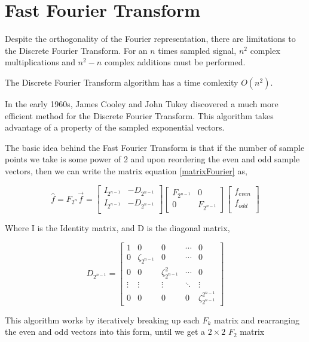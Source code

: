 \documentclass[11pt]{amsart}
\theoremstyle{definition}
\theoremstyle{remark}
\numberwithin{equation}{section}
\begin{document}
\section{Fast Fourier Transform}
Despite the orthogonality of the Fourier representation, there are limitations to the Discrete Fourier Transform. For an $n$ times sampled signal, $n^2$ complex multiplications and $n^2 - n$ complex additions must be performed.

The Discrete Fourier Transform algorithm has a time comlexity $O(n^2)$.

In the early 1960s, James Cooley and John Tukey discovered a much more efficient method for the Discrete Fourier Transform. This algorithm takes advantage of a property of the sampled exponential vectors.

The basic idea behind the Fast Fourier Transform is that if the number of sample points we take is some power of 2 and upon reordering the even and odd sample vectors, then we can write the matrix equation \ref{matrixFourier} as,

\[
	\hat{f} = F_{2^n} \vec{f} = \begin{bmatrix}
		I_{2^{n-1}} & -D_{2^{n-1}} \\
		I_{2^{n-1}} & -D_{2^{n-1}} \\
	\end{bmatrix}
	\begin{bmatrix}
		F_{2^{n-1}} & 0 \\
	0 & F_{2^{n-1}}
	\end{bmatrix}
	\begin{bmatrix}
		f_{even} \\
		f_{odd} \\
	\end{bmatrix}
\]

Where I is the Identity matrix, and D is the diagonal matrix,

\[
	D_{2^{n-1}} = \begin{bmatrix}
		1 & 0 & 0 & \cdots & 0 \\
		0 & \zeta_{2^{n-1}} & 0 &\cdots & 0\\
		0 & 0 & \zeta_{2^{n-1}}^2 & \cdots & 0 \\
		\vdots & \vdots & \vdots  &  \ddots & \vdots \\
		0 & 0 & 0 & 0 & \zeta_{2^{n-1}}^{2^{n-1}}
	\end{bmatrix}
\]

This algorithm works by iteratively breaking up each $F_k$ matrix and rearranging the even and odd vectors into this form, until we get a $2\times 2$ $F_2$ matrix
\end{document}
